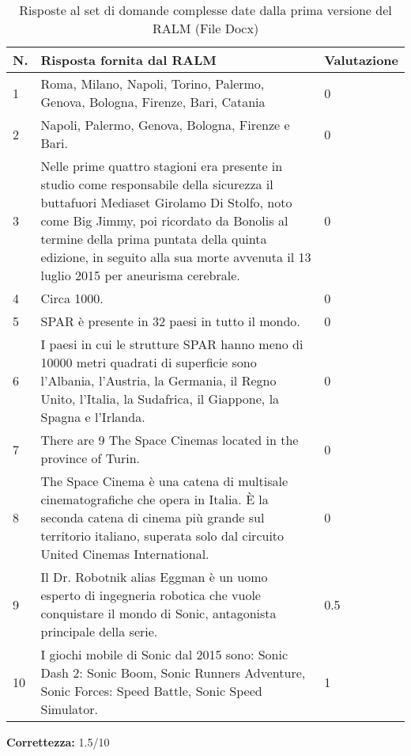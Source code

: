 \begin{table}[H]
    \centering
    \begin{tabular}{|p{0.5cm} |p{6cm} |p{2cm}|}
        \hline
        \textbf{N}. & \textbf{Risposta fornita dal RALM} & \textbf{Valutazione} \\
        \hline
        1 & Roma, Milano, Napoli, Torino, Palermo, Genova, Bologna, Firenze, Bari, Catania & 0 \\
        \hline
        2 & Napoli, Palermo, Genova, Bologna, Firenze e Bari. & 0 \\
        \hline
        3 & Nelle prime quattro stagioni era presente in studio come responsabile della sicurezza il buttafuori Mediaset Girolamo Di Stolfo, noto come Big Jimmy, poi ricordato da Bonolis al termine della prima puntata della quinta edizione, in seguito alla sua morte avvenuta il 13 luglio 2015 per aneurisma cerebrale. & 0 \\
        \hline
        4 & Circa 1000. & 0 \\
        \hline
        5 & SPAR è presente in 32 paesi in tutto il mondo. & 0 \\
        \hline
        6 & I paesi in cui le strutture SPAR hanno meno di 10000 metri quadrati di superficie sono l'Albania, l'Austria, la Germania, il Regno Unito, l'Italia, la Sudafrica, il Giappone, la Spagna e l'Irlanda. & 0 \\
        \hline
        7 & There are 9 The Space Cinemas located in the province of Turin. & 0 \\
        \hline
        8 & The Space Cinema è una catena di multisale cinematografiche che opera in Italia. È la seconda catena di cinema più grande sul territorio italiano, superata solo dal circuito United Cinemas International. & 0 \\
        \hline
        9 & Il Dr. Robotnik alias Eggman è un uomo esperto di ingegneria robotica che vuole conquistare il mondo di Sonic, antagonista principale della serie. & 0.5 \\
        \hline
        10 & I giochi mobile di Sonic dal 2015 sono: Sonic Dash 2: Sonic Boom, Sonic Runners Adventure, Sonic Forces: Speed Battle, Sonic Speed Simulator. & 1 \\
        \hline
    \end{tabular}
    \caption{Risposte al set di domande complesse date dalla prima versione del RALM (File Docx)}
\end{table}

\textbf{Correttezza:} 1.5/10

